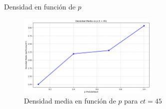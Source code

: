 \documentclass[aspectratio=169]{beamer}
\begin{document}
\begin{frame}{Densidad en función de $p$}
    \begin{figure}
        \centering
        \includegraphics[width=0.6\textwidth]{img/average_density_t45.png}
        \caption{Densidad media en función de $p$ para $ct=45$}
    \end{figure}
\end{frame}

\end{document}
